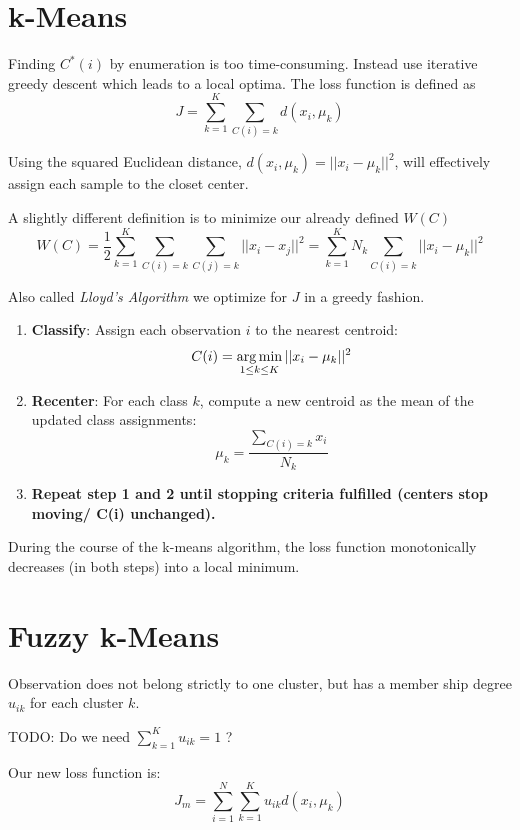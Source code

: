 \section{k-Means}
Finding $C^*(i)$ by enumeration is too time-consuming. Instead use iterative greedy descent which leads to a local optima.
The loss function is defined as
\begin{equation}
J = \sum_{k=1}^K \sum_{C(i)=k} d(x_i, \mu_k)
\end{equation}

Using the squared Euclidean distance, $d(x_i, \mu_k) = ||x_i - \mu_k||^2$, will effectively assign each sample to the closet center.

A slightly different definition is to minimize our already defined $W(C)$
\begin{equation}
W(C) = \frac{1}{2} \sum\limits_{k=1}^K \sum\limits_{C(i)=k} \sum\limits_{C(j)=k} ||x_i - x_j||^2 = \sum\limits_{k=1}^K N_k \sum\limits_{C(i)=k} ||x_i - \mu_k||^2
\end{equation}

Also called \emph{Lloyd's Algorithm} we optimize for $J$ in a greedy fashion.
\begin{enumerate}
\item \textbf{Classify}: Assign each observation $i$ to the nearest centroid: $$C(i) = \operatorname*{arg\,min}\limits_{1\leq k \leq K} ||x_i - \mu_k||^2$$
\item \textbf{Recenter}: For each class $k$, compute a new centroid as the mean of the updated class assignments: $$\mu_k = \frac{\sum\limits_{C(i)=k} x_i}{N_k}$$
\item \textbf{Repeat step 1 and 2 until stopping criteria fulfilled (\eg centers stop moving/ C(i) unchanged).}
\end{enumerate}

During the course of the k-means algorithm, the loss function monotonically decreases (in both steps) into a local minimum.

\section{Fuzzy k-Means}\label{sec:fuzzy-kmeans}
Observation does not belong strictly to one cluster, but has a member ship degree $u_{ik}$ for each cluster $k$.

TODO: Do we need $\sum_{k=1}^K u_{ik} = 1$ ?

Our new loss function is:
\begin{equation}
J_m = \sum_{i=1}^N \sum_{k=1}^K u_{ik} d(x_i, \mu_k)
\end{equation}

